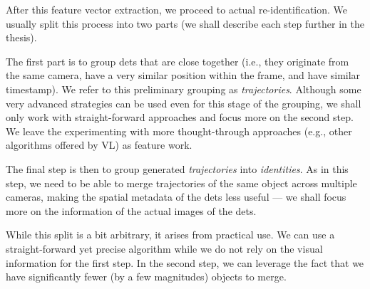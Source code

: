 After this feature vector extraction, we proceed to actual re-identification. We usually split this process into two parts (we shall describe each step further in the thesis).

The first part is to group \glspl{det} that are close together (i.e., they originate from the same camera, have a very similar position within the frame, and have similar timestamp). We refer to this preliminary grouping as \emph{trajectories}. Although some very advanced strategies can be used even for this stage of the grouping, we shall only work with straight-forward approaches and focus more on the second step. We leave the experimenting with more thought-through approaches (e.g., other algorithms offered by \gls{VL}) as feature work.


The final step is then to group generated \emph{trajectories} into \emph{identities}. As in this step, we need to be able to merge trajectories of the same object across multiple cameras, making the spatial metadata of the \glspl{det} less useful --- we shall focus more on the information of the actual images of the \glspl{det}.

While this split is a bit arbitrary, it arises from practical use. We can use a straight-forward yet precise algorithm while we do not rely on the visual information for the first step. In the second step, we can leverage the fact that we have significantly fewer (by a few magnitudes) objects to merge.
